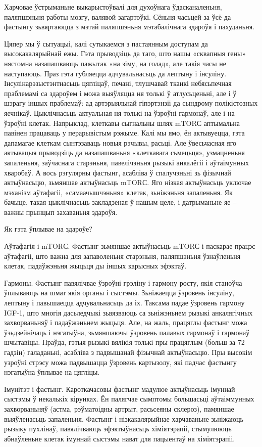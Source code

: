 Харчовае ўстрыманьне выкарыстоўвалі для духоўнага ўдасканаленьня, паляпшэньня работы мозгу, валявой загартоўкі. Сёньня часьцей за ўсё да фастынгу зьвяртаюцца з мэтай паляпшэньня мэтабалічнага здароўя і пахуданьня.

Цяпер мы ў сытуацыі, калі сутыкаемся з пастаянным доступам да высокакалярыйнай ежы. Гэта прыводзіць да таго, што нашы «сквапныя гены» нястомна назапашваюць пажытак «на зіму, на голад», але такія часы не наступаюць. Праз гэта губляецца адчувальнасьць да лептыну і інсуліну. Інсулінарэзыстэнтнасьць цягліцаў, печані, тлушчавай тканкі небясьпечная праблемамі са здароўем і можа выяўляцца ня толькі ў атлусьценьні, але і ў шэрагу іншых праблемаў: ад артэрыяльнай гіпэртэнзіі да сындрому полікістозных яечнікаў.
Цыклічнасьць актуальная ня толькі на ўзроўні гармонаў, але і на ўзроўні клетак. Напрыклад, клеткавы сыгнальны шлях mTORС аптымальна павінен працаваць у перарывістым рэжыме. Калі мы ямо, ён актывуецца, гэта дапамагае клеткам сынтэзаваць новыя рэчывы, расьці. Але ўвесьчасная яго актывацыя прыводзіць да назапашваньня «клеткавага сьмецьця», узмацненьня запаленьня, заўчаснага старэньня, павелічэньня рызыкі анкалёгіі і аўтаімунных хваробаў. А вось рэгулярны фастынг, асабліва ў спалучэньні зь фізычнай актыўнасьцю, зьмяншае актыўнасьць mTORС. Яго нізкая актыўнасьць уключае мэханізм аўтафагіі, «самаачышчэньня» клетак, зьніжэньня запаленьня. Як бачыце, такая цыклічнасьць закладзеная ў нашым целе, і датрыманьне яе – важны прынцып захаваньня здароўя.

Як гэта ўплывае на здароўе?

Аўтафагія і mTORС.
Фастынг зьмяншае актыўнасьць mTORС і паскарае працэс аўтафагіі, што важна для запаволеньня старэньня, паляпшэньня ўзнаўленьня клетак, падаўжэньня жыцьця ды іншых карысных эфэктаў.

Гармоны.
Фастынг павялічвае ўзроўні грэліну і гармону росту, якія станоўча ўплываюць на шмат якія органы і сыстэмы. Зьніжаецца ўзровень інсуліну, лептыну і павышаецца адчувальнасьць да іх. Таксама падае ўзровень гармону IGF-1, што многія дасьледчыкі зьвязваюць са зьніжэньнем рызыкі анкалягічных захворваньняў і падаўжэньнем жыцьця. Але, на жаль, працяглы фастынг можа ўзьдзейнічаць і нэгатыўна, зьмяншаючы ўзровень палавых гармонаў і гармонаў шчытавіцы. Праўда, гэтыя рызыкі вялікія толькі пры працяглым (больш за 72 гадзін) галаданьні, асабліва з падвышанай фізычнай актыўнасьцю. Пры высокім узроўні стрэсу можа падвышацца ўзровень картызолу, які падчас фастынгу нэгатыўна ўплывае на цягліцы.

Імунітэт і фастынг.
Кароткачасовы фастынг мадулюе актыўнасьць імуннай сыстэмы ў некалькіх кірунках. Ён палягчае сымптомы большасьці аўтаіммунных захворваньняў (астма, рэўматоідны артрыт, расьсеяны склероз), памяншае выяўленасьць запаленьня. Фастынг і нізкакалярыйнае харчаваньне зьніжаюць рызыку пухлінаў, павялічваюць эфэктыўнасьць хіміятэрапіі, стымулююць абнаўленьне клетак імуннай сыстэмы нават для пацыентаў на хіміятэрапіі.

